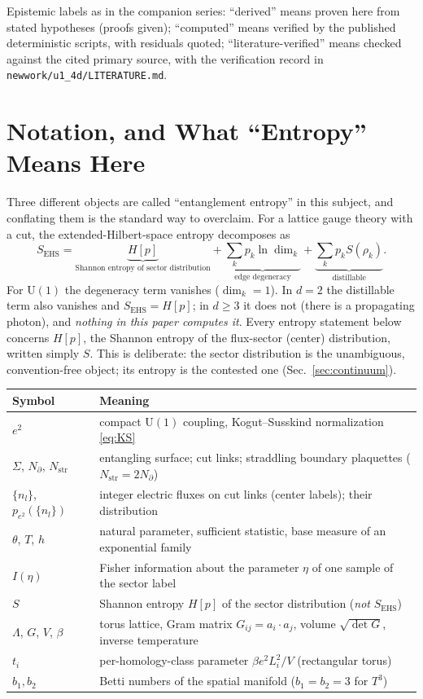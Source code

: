 \documentclass[11pt]{article}
\theoremstyle{remark}
\theoremstyle{plain}
\begin{document}
Epistemic labels as in the companion series: ``derived'' means proven here from stated hypotheses (proofs given); ``computed'' means verified by the published deterministic scripts, with residuals quoted; ``literature-verified'' means checked against the cited primary source, with the verification record in \texttt{newwork/u1\_4d/LITERATURE.md}.

\section{Notation, and What ``Entropy'' Means Here}\label{sec:notation}

Three different objects are called ``entanglement entropy'' in this subject, and conflating them is the standard way to overclaim. For a lattice gauge theory with a cut, the extended-Hilbert-space entropy decomposes as \cite{D11, CHR, GST15}
\[
S_{\mathrm{EHS}} = \underbrace{H[p]}_{\text{Shannon entropy of sector distribution}} + \underbrace{\textstyle\sum_k p_k \ln \dim_k}_{\text{edge degeneracy}} + \underbrace{\textstyle\sum_k p_k S(\rho_k)}_{\text{distillable}} .
\]
For $\mathrm{U}(1)$ the degeneracy term vanishes ($\dim_k = 1$). In $d = 2$ the distillable term also vanishes and $S_{\mathrm{EHS}} = H[p]$; in $d \geq 3$ it does not (there is a propagating photon), and \emph{nothing in this paper computes it}. Every entropy statement below concerns $H[p]$, the Shannon entropy of the flux-sector (center) distribution, written simply $S$. This is deliberate: the sector distribution is the unambiguous, convention-free object; its entropy is the contested one (Sec.~\ref{sec:continuum}).

\begin{center}
\small
\begin{tabular}{ll}
\toprule
Symbol & Meaning \\
\midrule
$e^2$ & compact $\mathrm{U}(1)$ coupling, Kogut--Susskind normalization \eqref{eq:KS} \\
$\Sigma$, $N_\partial$, $N_{\mathrm{str}}$ & entangling surface; cut links; straddling boundary plaquettes ($N_{\mathrm{str}} = 2N_\partial$) \\
$\{n_l\}$, $p_{e^2}(\{n_l\})$ & integer electric fluxes on cut links (center labels); their distribution \\
$\theta$, $T$, $h$ & natural parameter, sufficient statistic, base measure of an exponential family \\
$I(\eta)$ & Fisher information about the parameter $\eta$ of one sample of the sector label \\
$S$ & Shannon entropy $H[p]$ of the sector distribution (\emph{not} $S_{\mathrm{EHS}}$) \\
$\Lambda$, $G$, $V$, $\beta$ & torus lattice, Gram matrix $G_{ij} = a_i \cdot a_j$, volume $\sqrt{\det G}$, inverse temperature \\
$t_i$ & per-homology-class parameter $\beta e^2 L_i^2 / V$ (rectangular torus) \\
$b_1, b_2$ & Betti numbers of the spatial manifold ($b_1 = b_2 = 3$ for $T^3$) \\
\bottomrule
\end{tabular}
\end{center}
\end{document}
